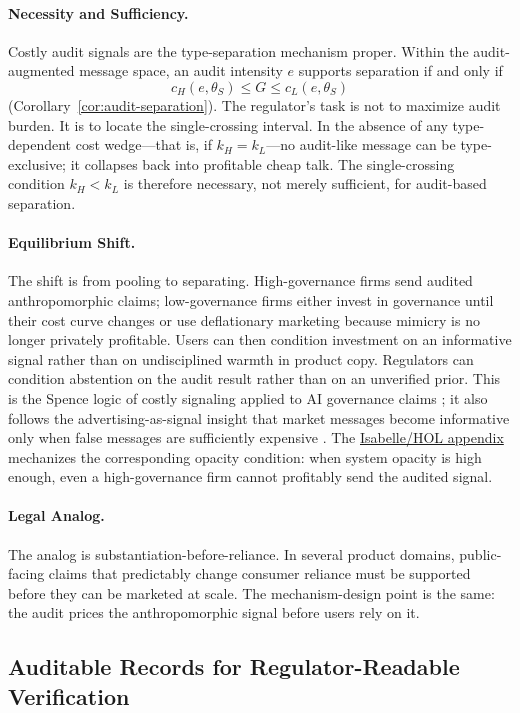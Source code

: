 \documentclass[review,authoryear]{elsarticle}
\theoremstyle{definition}
\theoremstyle{plain}
\begin{document}
\paragraph{Necessity and Sufficiency.}
Costly audit signals are the type-separation mechanism proper.  Within the
audit-augmented message space, an audit intensity $e$ supports separation if
and only if
\[
c_H(e,\theta_S)\le G \le c_L(e,\theta_S)
\]
(Corollary~\ref{cor:audit-separation}).  The regulator's task is not to
maximize audit burden.  It is to locate the single-crossing interval.
In the absence of any type-dependent cost wedge---that is, if $k_H=k_L$---no
audit-like message can be type-exclusive; it collapses back into profitable
cheap talk.  The single-crossing condition $k_H<k_L$ is therefore necessary,
not merely sufficient, for audit-based separation.

\paragraph{Equilibrium Shift.}
The shift is from pooling to separating. High-governance firms send audited
anthropomorphic claims; low-governance firms either invest in governance until
their cost curve changes or use deflationary marketing because mimicry is no longer privately profitable. Users can then condition
investment on an informative signal rather than on undisciplined warmth in
product copy. Regulators can condition abstention on the audit result rather
than on an unverified prior. This is the Spence logic of costly signaling
applied to AI governance claims \citep{spence1973}; it also follows the
advertising-as-signal insight that market messages become informative only when
false messages are sufficiently expensive \citep{milgrom_roberts1986}. The \hyperref[app:isabelle]{Isabelle/HOL appendix} mechanizes the corresponding opacity condition: when system opacity is high enough, even a high-governance firm cannot profitably send the audited signal.

\paragraph{Legal Analog.}
The analog is substantiation-before-reliance.  In several product domains, public-facing claims that predictably change consumer reliance must be supported before they can be marketed at scale.  The mechanism-design point is the same: the audit prices the anthropomorphic signal before users rely on it.

\subsection{Auditable Records for Regulator-Readable Verification}
\label{subsec:auditable-records}
\end{document}
